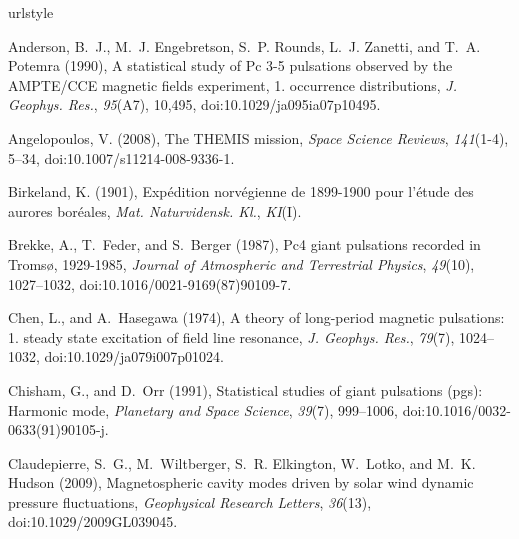 \documentclass[draft,linenumbers]{agujournal}
\begin{document}



% 


\begin{thebibliography}{62}
\providecommand{\natexlab}[1]{#1}
\expandafter\ifx\csname urlstyle\endcsname\relax
  \providecommand{\doi}[1]{doi:\discretionary{}{}{}#1}\else
  \providecommand{\doi}{doi:\discretionary{}{}{}\begingroup
  \urlstyle{rm}\Url}\fi

Anderson, B.~J., M.~J. Engebretson, S.~P. Rounds, L.~J. Zanetti, and T.~A.
  Potemra (1990), A statistical study of {Pc} 3-5 pulsations observed by the
  {AMPTE}/{CCE} magnetic fields experiment, 1. occurrence distributions,
  \textit{J. Geophys. Res.}, \textit{95}(A7), 10,495,
  \doi{10.1029/ja095ia07p10495}.

Angelopoulos, V. (2008), The {THEMIS} mission, \textit{Space Science Reviews},
  \textit{141}(1-4), 5--34, \doi{10.1007/s11214-008-9336-1}.

Birkeland, K. (1901), Exp{\'e}dition norv{\'e}gienne de 1899-1900 pour
  l'{\'e}tude des aurores bor{\'e}ales, \textit{Mat. Naturvidensk. Kl.},
  \textit{KI}(I).

Brekke, A., T.~Feder, and S.~Berger (1987), Pc4 giant pulsations recorded in
  {Troms{\o}}, 1929-1985, \textit{Journal of Atmospheric and Terrestrial
  Physics}, \textit{49}(10), 1027--1032, \doi{10.1016/0021-9169(87)90109-7}.

Chen, L., and A.~Hasegawa (1974), A theory of long-period magnetic pulsations:
  1. steady state excitation of field line resonance, \textit{J. Geophys.
  Res.}, \textit{79}(7), 1024--1032, \doi{10.1029/ja079i007p01024}.

Chisham, G., and D.~Orr (1991), Statistical studies of giant pulsations (pgs):
  Harmonic mode, \textit{Planetary and Space Science}, \textit{39}(7),
  999--1006, \doi{10.1016/0032-0633(91)90105-j}.

Claudepierre, S.~G., M.~Wiltberger, S.~R. Elkington, W.~Lotko, and M.~K. Hudson
  (2009), Magnetospheric cavity modes driven by solar wind dynamic pressure
  fluctuations, \textit{Geophysical Research Letters}, \textit{36}(13),
  \doi{10.1029/2009GL039045}.


\end{thebibliography}
\end{document}
